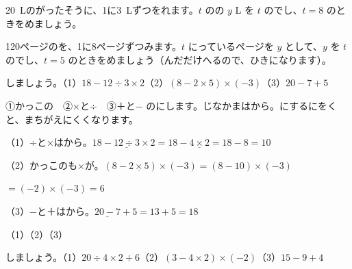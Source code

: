 \begin{jibun}
\qty{20}{L}のがったそうに、1に\qty{3}{L}ずつをれます。$t$ のの $y$ L を $t$ のでし、$t=8$ のときをめましょう。
\end{jibun}

\begin{jibun}
120ページのを、1に8ページずつみます。$t$ にっているページを $y$ として、$y$ を $t$ のでし、$t=5$ のときをめましょう（んだだけへるので、ひきになります）。
\end{jibun}

\begin{reidai}[\R{計算}{けい|さん}の\R{順番}{じゅん|ばん}]
しましょう。\quad（1）\nobreak $18-12\div3\times2$\quad（2）\nobreak $(8-2\times5)\times(-3)$\quad（3）\nobreak $20-7+5$\par
\kangaekata ①かっこの　②×と÷　③＋と− のにします。じなかまはから。にするにをくと、まちがえにくくなります。\par
\shiki（1）÷と×はから。$18-\underline{12\div3}\times2=18-\underline{4\times2}=18-8=10$\par
\hspace*{2.6\zw}（2）かっこのも×が。$(8-\underline{2\times5})\times(-3)=(8-10)\times(-3)$\par
\hspace*{4.6\zw}$=(-2)\times(-3)=6$\par
\hspace*{2.6\zw}（3）−と＋はから。$\underline{20-7}+5=13+5=18$\par
\kotae（1）\quad（2）\quad（3）
\end{reidai}

\begin{jibun}
しましょう。\quad（1）\nobreak $20\div4\times2+6$\quad（2）\nobreak $(3-4\times2)\times(-2)$\quad（3）\nobreak $15-9+4$
\end{jibun}

